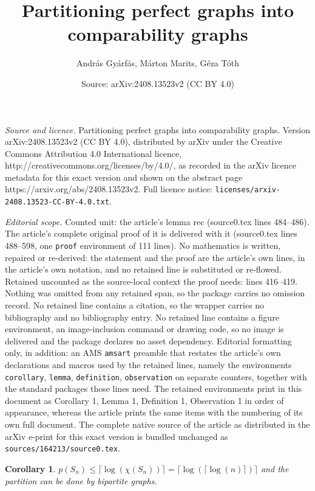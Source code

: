 \documentclass[10pt,a4paper]{amsart}
\title{Partitioning perfect graphs into comparability graphs}
\author{Andr\'as Gy\'arf\'as, M\'arton Marits, G\'eza T\'oth}
\date{Source: arXiv:2408.13523v2 (CC BY 4.0)}
\newtheorem{corollary}{Corollary}
\begin{document}
\maketitle

\noindent\emph{Source and licence.} Partitioning perfect graphs into comparability graphs. Version arXiv:2408.13523v2 (CC BY 4.0), distributed by arXiv under the Creative Commons Attribution 4.0 International licence, http://creativecommons.org/licenses/by/4.0/, as recorded in the arXiv licence metadata for this exact version and shown on the abstract page https://arxiv.org/abs/2408.13523v2. Full licence notice: \texttt{licenses/arxiv-2408.13523-CC-BY-4.0.txt}.\par\smallskip

\noindent\textit{Editorial scope.} Counted unit: the article's lemma rec (source0.tex lines 484--486). The article's complete original proof of it is delivered with it (source0.tex lines 488--598, one \texttt{proof} environment of 111 lines). No mathematics is written, repaired or re-derived: the statement and the proof are the article's own lines, in the article's own notation, and no retained line is substituted or re-flowed.  Retained uncounted as the source-local context the proof needs: lines 416--419.  Nothing was omitted from any retained span, so the package carries no omission record.  No retained line contains a citation, so the wrapper carries no bibliography and no bibliography entry.  No retained line contains a figure environment, an image-inclusion command or drawing code, so no image is delivered and the package declares no asset dependency.  Editorial formatting only, in addition: an AMS \texttt{amsart} preamble that restates the article's own declarations and macros used by the retained lines, namely the environments \texttt{corollary}, \texttt{lemma}, \texttt{definition}, \texttt{observation} on separate counters, together with the standard packages those lines need.  The retained environments print in this document as Corollary 1, Lemma 1, Definition 1, Observation 1 in order of appearance, whereas the article prints the same items with the numbering of its own full document.  The complete native source of the article as distributed in the arXiv e-print for this exact version is bundled unchanged as \texttt{sources/164213/source0.tex}.
\begin{corollary}\label{shift}
  $p(S_n)\le \lceil \log(\chi(S_n))\rceil = \lceil\log(\lceil\log(n)\rceil)\rceil$
  and the partition can be done by bipartite graphs.
\end{corollary}
\end{document}
